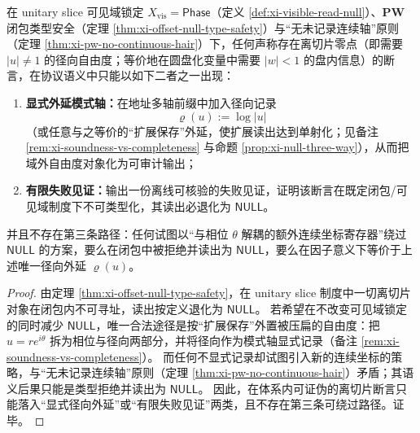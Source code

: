 
\begin{corollary}\label{cor:xi-fourth-register-dichotomy}
在 unitary slice 可见域锁定 \(X_{\mathrm{vis}}=\mathsf{Phase}\)（定义 \ref{def:xi-visible-read-null}）、\(\mathbf{PW}\) 闭包类型安全（定理 \ref{thm:xi-offset-null-type-safety}）与“无未记录连续轴”原则（定理 \ref{thm:xi-pw-no-continuous-hair}）下，任何声称存在离切片零点（即需要 \(|u|\neq 1\) 的径向自由度；等价地在圆盘化变量中需要 \(|w|<1\) 的盘内信息）的断言，在协议语义中只能以如下二者之一出现：
\begin{enumerate}
  \item \textbf{显式外延模式轴：}在地址多轴前缀中加入径向记录
  \[
  \varrho(u):=\log|u|
  \]
  （或任意与之等价的“扩展保存”外延，使扩展读出达到单射化；见备注 \ref{rem:xi-soundness-vs-completeness} 与命题 \ref{prop:xi-null-three-way}），从而把域外自由度对象化为可审计输出；
  \item \textbf{有限失败见证：}输出一份离线可核验的失败见证，证明该断言在既定闭包/可见域制度下不可类型化，其读出必退化为 \(\mathsf{NULL}\)。
\end{enumerate}
并且不存在第三条路径：任何试图以“与相位 \(\theta\) 解耦的额外连续坐标寄存器”绕过 \(\mathsf{NULL}\) 的方案，要么在闭包中被拒绝并读出为 \(\mathsf{NULL}\)，要么在因子意义下等价于上述唯一径向外延 \(\varrho(u)\)。
\end{corollary}
\begin{proof}
由定理 \ref{thm:xi-offset-null-type-safety}，在 unitary slice 制度中一切离切片对象在闭包内不可寻址，读出按定义退化为 \(\mathsf{NULL}\)。
若希望在不改变可见域锁定的同时减少 \(\mathsf{NULL}\)，唯一合法途径是按“扩展保存”外置被压扁的自由度：把 \(u=re^{i\theta}\) 拆为相位与径向两部分，并将径向作为模式轴显式记录（备注 \ref{rem:xi-soundness-vs-completeness}）。
而任何不显式记录却试图引入新的连续坐标的策略，与“无未记录连续轴”原则（定理 \ref{thm:xi-pw-no-continuous-hair}）矛盾；其语义后果只能是类型拒绝并读出为 \(\mathsf{NULL}\)。
因此，在体系内可证伪的离切片断言只能落入“显式径向外延”或“有限失败见证”两类，且不存在第三条可绕过路径。证毕。
\end{proof}


